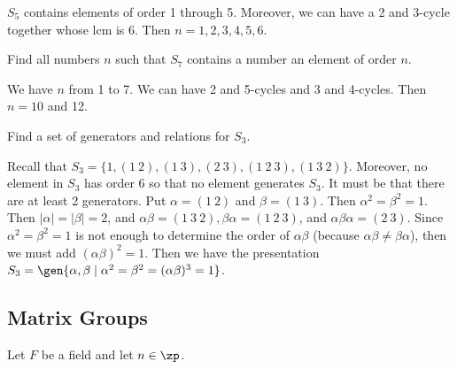 \begin{problems}
    \begin{sol}
        $S_5$ contains elements of order 1 through 5. Moreover, we can have a 2 and 3-cycle together whose lcm is 6. Then $n = 1, 2, 3, 4, 5, 6$.
    \end{sol}
    \item Find all numbers $n$ such that $S_7$ contains a number an element of order $n$.
    \begin{sol}
        We have $n$ from 1 to 7. We can have 2 and 5-cycles and 3 and 4-cycles. Then $n = 10$ and 12.
    \end{sol}
    \item Find a set of generators and relations for $S_3$.
    \label{ex1.4.20}
    \begin{sol}
        Recall that $S_3 = \{1, (1\ 2), (1\ 3), (2\ 3), (1\ 2\ 3), (1\ 3\ 2)\}$. Moreover, no element in $S_3$ has order 6 so that no element generates $S_3$. It must be that there are at least 2 generators. Put $\alpha = (1\ 2)$ and $\beta = (1\ 3)$. Then $\alpha^2 = \beta^2 = 1$. Then $|\alpha| = |\beta| = 2$, and $\alpha\beta = (1\ 3\ 2), \beta\alpha = (1\ 2\ 3)$, and $\alpha\beta\alpha = (2\ 3)$. Since $\alpha^2 = \beta^2 = 1$ is not enough to determine the order of $\alpha\beta$ (because $\alpha\beta \neq \beta\alpha$), then we must add $(\alpha\beta)^2 = 1$. Then we have the presentation $S_3 = \gen{\alpha, \beta \mid \alpha^2 = \beta^2 = (\alpha\beta)^3 = 1}$.
    \end{sol}
\end{problems}

\newpage

\subsection{Matrix Groups}

Let $F$ be a field and let $n \in \zp$.

